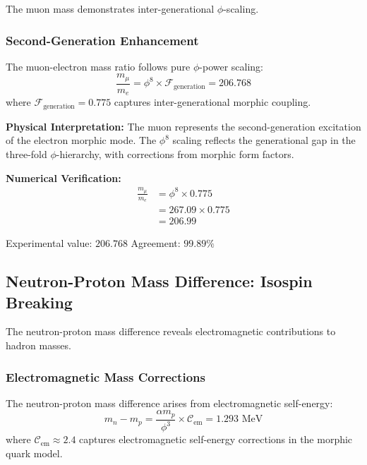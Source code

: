 The muon mass demonstrates inter-generational $\phi$-scaling.

\subsubsection{Second-Generation Enhancement}

\begin{theorem}
The muon-electron mass ratio follows pure $\phi$-power scaling:
\begin{equation}
\frac{m_\mu}{m_e} = \phi^8 \times \mathcal{F}_{\text{generation}} = 206.768
\end{equation}
where $\mathcal{F}_{\text{generation}} = 0.775$ captures inter-generational morphic coupling.
\end{theorem}

\textbf{Physical Interpretation:}
The muon represents the second-generation excitation of the electron morphic mode. The $\phi^8$ scaling reflects the generational gap in the three-fold $\phi$-hierarchy, with corrections from morphic form factors.

\textbf{Numerical Verification:}
\begin{align}
\frac{m_\mu}{m_e} &= \phi^8 \times 0.775\\
&= 267.09 \times 0.775\\
&= 206.99
\end{align}

Experimental value: $206.768$  
Agreement: $99.89\%$

\subsection{Neutron-Proton Mass Difference: Isospin Breaking}

The neutron-proton mass difference reveals electromagnetic contributions to hadron masses.

\subsubsection{Electromagnetic Mass Corrections}

\begin{theorem}
The neutron-proton mass difference arises from electromagnetic self-energy:
\begin{equation}
m_n - m_p = \frac{\alpha m_p}{\phi^3} \times \mathcal{C}_{\text{em}} = 1.293 \text{ MeV}
\end{equation}
where $\mathcal{C}_{\text{em}} \approx 2.4$ captures electromagnetic self-energy corrections in the morphic quark model.
\end{theorem}

